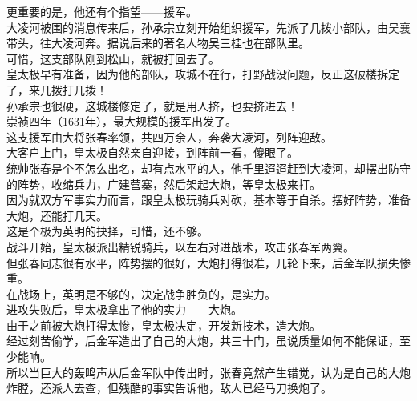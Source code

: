 \begin{multicols}{\theparacolNo}
更重要的是，他还有个指望——援军。\\

大凌河被围的消息传来后，孙承宗立刻开始组织援军，先派了几拨小部队，由吴襄带头，往大凌河奔。据说后来的著名人物吴三桂也在部队里。\\

可惜，这支部队刚到松山，就被打回去了。\\

皇太极早有准备，因为他的部队，攻城不在行，打野战没问题，反正这破楼拆定了，来几拨打几拨！\\

孙承宗也很硬，这城楼修定了，就是用人挤，也要挤进去！\\

崇祯四年（1631年），最大规模的援军出发了。\\

这支援军由大将张春率领，共四万余人，奔袭大凌河，列阵迎敌。\\

大客户上门，皇太极自然亲自迎接，到阵前一看，傻眼了。\\

统帅张春是个不怎么出名，却有点水平的人，他千里迢迢赶到大凌河，却摆出防守的阵势，收缩兵力，广建营寨，然后架起大炮，等皇太极来打。\\

因为就双方军事实力而言，跟皇太极玩骑兵对砍，基本等于自杀。摆好阵势，准备大炮，还能打几天。\\

这是个极为英明的抉择，可惜，还不够。\\

战斗开始，皇太极派出精锐骑兵，以左右对进战术，攻击张春军两翼。\\

但张春同志很有水平，阵势摆的很好，大炮打得很准，几轮下来，后金军队损失惨重。\\

在战场上，英明是不够的，决定战争胜负的，是实力。\\

进攻失败后，皇太极拿出了他的实力——大炮。\\

由于之前被大炮打得太惨，皇太极决定，开发新技术，造大炮。\\

经过刻苦偷学，后金军造出了自己的大炮，共三十门，虽说质量如何不能保证，至少能响。\\

所以当巨大的轰鸣声从后金军队中传出时，张春竟然产生错觉，认为是自己的大炮炸膛，还派人去查，但残酷的事实告诉他，敌人已经马刀换炮了。\\


\end{multicols}
